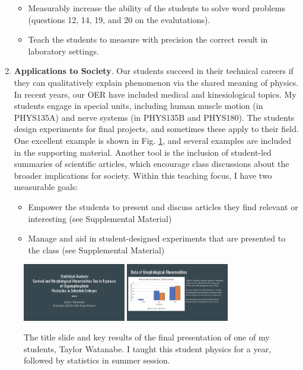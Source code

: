 \documentclass[../../../main.tex]{subfiles}
\begin{document}
\begin{enumerate}
\begin{itemize}
\item Measurably increase the ability of the students to solve word problems (questions 12, 14, 19, and 20 on the evalutations).
\item Teach the students to measure with precision the correct result in laboratory settings.
\end{itemize}

\item \textbf{Applications to Society}. Our students succeed in their technical careers if they can qualitatively explain phenomenon via the shared meaning of physics.  In recent years, our OER \cite{openstax1} \cite{openstax2} have included medical and kinesiological topics.  My students engage in special units, including human muscle motion (in PHYS135A) and nerve systems (in PHYS135B and PHYS180).  The students design experiments for final projects, and sometimes these apply to their field.  One excellent example is shown in Fig. \ref{fig:taylor_1}, and several examples are included in the supporting material. Another tool is the inclusion of student-led summaries of scientific articles, which encourage class discussions about the broader implications for society.  Within this teaching focus, I have two measurable goals:

\begin{itemize}
\item Empower the students to present and discuss articles they find relevant or interesting (see Supplemental Material)
\item Manage and aid in student-designed experiments that are presented to the class (see Supplemental Material)
\end{itemize}

\end{enumerate}

\begin{figure}
\centering
\includegraphics[width=0.4\textwidth]{figures/taylor1.png}
\includegraphics[width=0.4\textwidth]{figures/taylor2.png}
\caption{\label{fig:taylor_1} The title slide and key results of the final presentation of one of my students, Taylor Watanabe.  I taught this student physics for a year, followed by statistics in summer session.}
\end{figure}
\end{document}
